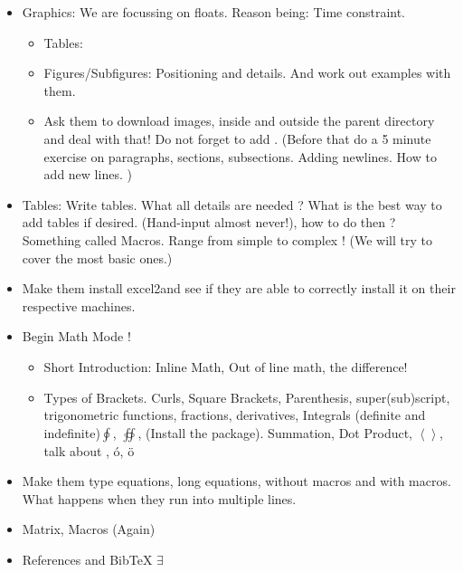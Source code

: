 \begin{itemize}
\item Graphics: We are focussing on floats. Reason being: Time constraint.
\begin{itemize}
\item Tables: 
\item Figures/Subfigures: Positioning and details. And work out examples with them. 
\item Ask them to download images, inside and outside the parent directory and deal with that! Do not forget to add . (Before that do a 5 minute exercise on paragraphs, sections, subsections. Adding newlines. How to add new lines. )
\end{itemize}
\item Tables: Write tables. What all details are needed ? What is the best way to add tables if desired. (Hand-input almost never!), how to do then ? Something called Macros. Range from simple to complex ! (We will try to cover the most basic ones.)
\item Make them install excel2\latex and see if they are able to correctly install it on their respective machines. 
\item Begin Math Mode ! 
\begin{itemize}
\item Short Introduction: Inline Math, Out of line math, the difference! 
\item Types of Brackets. Curls, Square Brackets, Parenthesis, super(sub)script, trigonometric functions, fractions, derivatives, Integrals (definite and indefinite)$\oint$, $\oiint$, (Install the  package). Summation, Dot Product, $\left<\right>$, talk about , \'{o}, \"{o}
\end{itemize}
\item Make them type equations, long equations, without macros and with macros. What happens when they run into multiple lines. 
\item Matrix, Macros (Again)
\item References and BibTeX $\exists$
\end{itemize}
